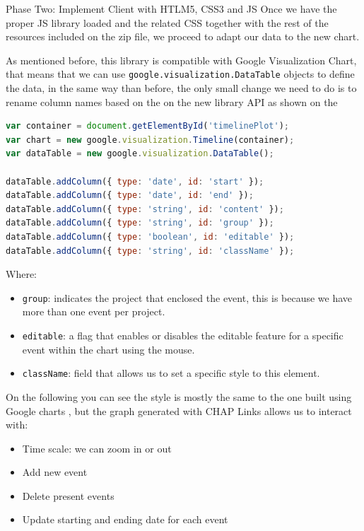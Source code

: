\begin{part}{Phase Two: Implement Client with HTLM5, CSS3 and JS}
Once we have the proper JS library loaded and the related CSS together with the
rest of the resources included on the zip file, we proceed to adapt our data to
the new chart.

As mentioned before, this library is compatible with Google Visualization
Chart, that means that we can use \texttt{google.visualization.DataTable}
objects to define the data, in the same way  than before, the only small change
we need to do is to rename column names based  on the on the new library API as
shown on the 

\begin{lstlisting}[language=Javascript,breaklines=true,caption=CHAP\ Link\
library,label=f_interactivetimelines_code]
var container = document.getElementById('timelinePlot');
var chart = new google.visualization.Timeline(container);
var dataTable = new google.visualization.DataTable();

dataTable.addColumn({ type: 'date', id: 'start' });
dataTable.addColumn({ type: 'date', id: 'end' });
dataTable.addColumn({ type: 'string', id: 'content' });
dataTable.addColumn({ type: 'string', id: 'group' });
dataTable.addColumn({ type: 'boolean', id: 'editable' });
dataTable.addColumn({ type: 'string', id: 'className' });
\end{lstlisting} 

Where:
\begin{itemize}
  \item \texttt{group}: indicates the project that enclosed the event, this is
  because we have more than one event per project.
  \item \texttt{editable}: a flag that enables or disables the editable feature
  for a specific event within the chart using the mouse.
  \item \texttt{className}: field that allows us to set a specific style to this
  element.
\end{itemize}

On the following  you can see the style is mostly the
same to the one built using Google charts \reffigure{f_timeline_google},
but the graph generated with CHAP Links allows us to interact with:
\begin{itemize}
  \item Time scale: we can zoom in or out
  \item Add new event
  \item Delete present events
  \item Update starting and ending date for each event
\end{itemize}


\end{part}
